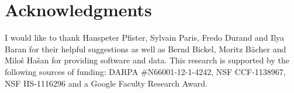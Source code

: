 
\chapter*{Acknowledgments}
\label{chap:ack}

I would like to thank Hanspeter Pfister, Sylvain Paris, Fredo Durand and Ilya Baran for their helpful suggestions as well as Bernd Bickel, Moritz B\"{a}cher and  Milo\v{s} Ha\v{s}an for providing software and data. This research is supported by the following sources of funding:  DARPA $\#$N66001-12-1-4242,  NSF CCF-1138967, NSF IIS-1116296 and a Google Faculty Research Award.
